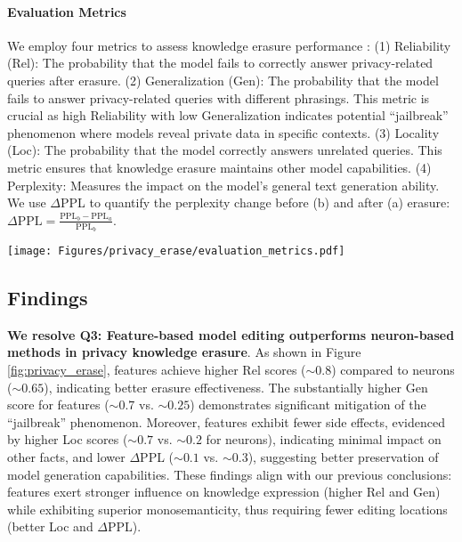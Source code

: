 \paragraph{Evaluation Metrics} We employ four metrics to assess knowledge erasure performance \citep{yao2024knowledge,chen2024knowledgelocalizationmissionaccomplished}:
(1) Reliability (Rel): The probability that the model fails to correctly answer privacy-related queries after erasure.
(2) Generalization (Gen): The probability that the model fails to answer privacy-related queries with different phrasings. This metric is crucial as high Reliability with low Generalization indicates potential ``jailbreak'' \citep{NEURIPS2023_fd661313} phenomenon where models reveal private data in specific contexts.
(3) Locality (Loc): The probability that the model correctly answers unrelated queries. This metric ensures that knowledge erasure maintains other model capabilities.
(4) Perplexity: Measures the impact on the model's general text generation ability. We use $\Delta$PPL to quantify the perplexity change before (b) and after (a) erasure: $\Delta \text{PPL} = \frac{\text{PPL}_b-\text{PPL}_a}{\text{PPL}_b}$.

\begin{figure*}
    \centering
    \texttt{[image: Figures/privacy\_erase/evaluation\_metrics.pdf]}
    \caption{Results of knowledge erasure for privacy protection. For the radar chart metrics (Rel, Gen and Loc), higher values indicate better performance, while lower values in the bar chart indicate better performance.}
    \label{fig:privacy_erase}
    \vspace{-3mm}
\end{figure*}
\subsection{Findings}
\textbf{We resolve Q3: Feature-based model editing outperforms neuron-based methods in privacy knowledge erasure}. As shown in Figure \ref{fig:privacy_erase}, features achieve higher Rel scores ($\sim0.8$) compared to neurons ($\sim0.65$), indicating better erasure effectiveness. The substantially higher Gen score for features ($\sim0.7$ vs. $\sim0.25$) demonstrates significant mitigation of the ``jailbreak'' phenomenon. Moreover, features exhibit fewer side effects, evidenced by higher Loc scores ($\sim0.7$ vs. $\sim0.2$ for neurons), indicating minimal impact on other facts, and lower $\Delta$PPL ($\sim0.1$ vs. $\sim0.3$), suggesting better preservation of model generation capabilities. These findings align with our previous conclusions: features exert stronger influence on knowledge expression (higher Rel and Gen) while exhibiting superior monosemanticity, thus requiring fewer editing locations (better Loc and $\Delta$PPL).



